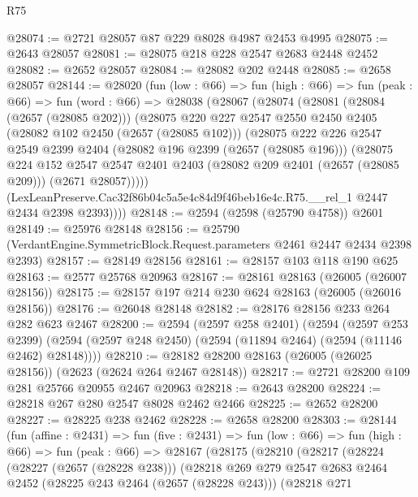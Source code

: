 \begin{lexlean}{R75}
\begin{coremodule}
@28074 := @2721 @28057 @87 @229 @8028 @4987 @2453 @4995
@28075 := @2643 @28057
@28081 := @28075 @218 @228 @2547 @2683 @2448 @2452
@28082 := @2652 @28057
@28084 := @28082 @202 @2448
@28085 := @2658 @28057
@28144 := @28020
    (fun (low : @66) =>
    fun (high : @66) =>
    fun (peak : @66) =>
    fun (word : @66) =>
    @28038
      (@28067
        (@28074
          (@28081
            (@28084 (@2657 (@28085 @202)))
            (@28075
              @220
              @227
              @2547
              @2550
              @2450
              @2405
              (@28082 @102 @2450 (@2657 (@28085 @102)))
              (@28075
                @222
                @226
                @2547
                @2549
                @2399
                @2404
                (@28082 @196 @2399 (@2657 (@28085 @196)))
                (@28075
                  @224
                  @152
                  @2547
                  @2547
                  @2401
                  @2403
                  (@28082 @209 @2401 (@2657 (@28085 @209)))
                  (@2671 @28057)))))
          (LexLeanPreserve.Cac32f86b04c5a5e4c84d9f46beb16e4c.R75.__rel_1 @2447 @2434 @2398 @2393))))
@28148 := @2594 (@2598 (@25790 @4758)) @2601
@28149 := @25976 @28148
@28156 := @25790 (VerdantEngine.SymmetricBlock.Request.parameters @2461 @2447 @2434 @2398 @2393)
@28157 := @28149 @28156
@28161 := @28157 @103 @118 @190 @625
@28163 := @2577 @25768 @20963
@28167 := @28161 @28163 (@26005 (@26007 @28156))
@28175 := @28157 @197 @214 @230 @624 @28163 (@26005 (@26016 @28156))
@28176 := @26048 @28148
@28182 := @28176 @28156 @233 @264 @282 @623 @2467
@28200 := @2594
    (@2597 @258 @2401)
    (@2594
      (@2597 @253 @2399)
      (@2594 (@2597 @248 @2450) (@2594 (@11894 @2464) (@2594 (@11146 @2462) @28148))))
@28210 := @28182 @28200 @28163 (@26005 (@26025 @28156)) (@2623 (@2624 @264 @2467 @28148))
@28217 := @2721 @28200 @109 @281 @25766 @20955 @2467 @20963
@28218 := @2643 @28200
@28224 := @28218 @267 @280 @2547 @8028 @2462 @2466
@28225 := @2652 @28200
@28227 := @28225 @238 @2462
@28228 := @2658 @28200
@28303 := @28144
    (fun (affine : @2431) =>
    fun (five : @2431) =>
    fun (low : @66) =>
    fun (high : @66) =>
    fun (peak : @66) =>
    @28167
      (@28175
        (@28210
          (@28217
            (@28224
              (@28227 (@2657 (@28228 @238)))
              (@28218
                @269
                @279
                @2547
                @2683
                @2464
                @2452
                (@28225 @243 @2464 (@2657 (@28228 @243)))
                (@28218
                  @271

\end{coremodule}
\end{lexlean}
